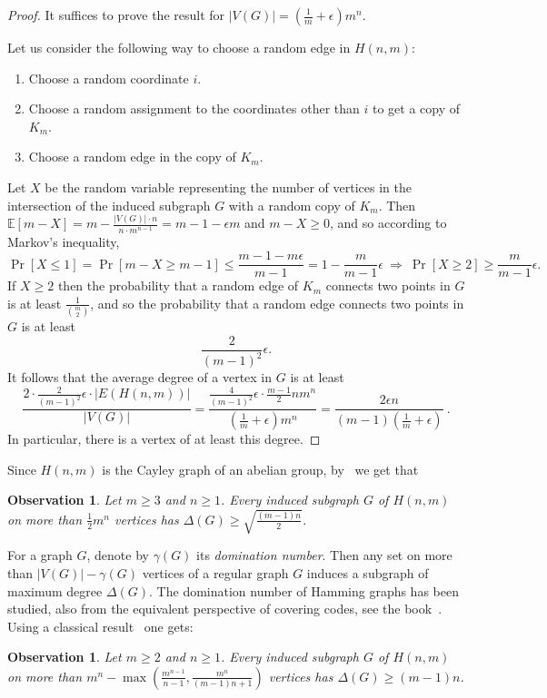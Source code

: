 \documentclass[a4paper,10pt]{amsart}
\newtheorem{obs}[thm]{Observation}
\begin{document}
\begin{proof} It suffices to prove the result for $|V(G)|=(\frac{1}{m}+\epsilon)m^n$.

\vspace{1mm}
Let us consider the following way to choose a random edge in $H(n,m)$:
\begin{enumerate}
    \item Choose a random coordinate $i$.
    \item Choose a random assignment to the coordinates other than $i$ to get a copy of $K_m$.
    \item Choose a random edge in the copy of $K_m$.
\end{enumerate}

Let $X$ be the random variable representing the number of vertices in the intersection of the induced subgraph $G$ with a random copy of $K_m$. Then $\mathbb{E}[m-X] = m -\frac{|V(G)|\cdot n}{n\cdot m^{n-1}} = m - 1 - \epsilon m$ and $m - X \geq 0$, and so according to Markov's inequality,
\[
 \Pr[X \leq 1] = \Pr[m - X \geq m - 1] \leq \frac{m - 1 - m\epsilon}{m - 1} = 1 - \frac{m}{m-1} \epsilon \ \Rightarrow\ \Pr[X \geq 2] \geq \frac{m}{m-1} \epsilon.
\]
If $X \geq 2$ then the probability that a random edge of $K_m$ connects two points in $G$ is at least $\frac{1}{\binom{m}{2}}$, and so the probability that a random edge connects two points in $G$ is at least
\[
 \frac{2}{(m-1)^2} \epsilon.
\]
It follows that the average degree of a vertex in $G$ is at least
\[
 \frac{2\cdot \frac{2}{(m-1)^2} \epsilon\cdot |E(H(n,m))|}{|V(G)|}=\frac{\frac{4}{(m-1)^2} \epsilon \cdot \frac{m-1}{2} n m^n}{(\frac{1}{m} + \epsilon) m^n} =
 \frac{2\epsilon n}{(m-1)(\frac{1}{m}+\epsilon)} \ .
\]
In particular, there is a vertex of at least this degree.
\end{proof}


Since $H(n,m)$ is the Cayley graph of an abelian group, by~\cite{PT20} we get that 

\begin{obs}
Let $m\geq 3$ and $n\geq 1$. Every induced subgraph $G$ of $H(n,m)$ on more than $\frac{1}{2}m^n$ vertices has $\Delta(G)\geq \sqrt{\frac{(m-1)n}{2}}$.
\end{obs}

For a graph $G$, denote by $\gamma(G)$ its \emph{domination number}. Then any set on more than $|V(G)|-\gamma(G)$ vertices of a regular graph $G$ induces a subgraph of maximum degree $\Delta(G)$. The domination number of Hamming graphs has been studied, also from the equivalent perspective of covering codes, see the book~\cite{CHLL97}. Using a classical result~\cite{Rod70} one gets:
\begin{obs}
    Let $m\geq 2$ and $n\geq 1$. Every induced subgraph $G$ of $H(n,m)$ on more than $m^n-\max\left(\frac{m^{n-1}}{n-1},\frac{m^n}{(m-1)n+1}\right)$ vertices has $\Delta(G)\geq (m-1)n$.
\end{obs}
\end{document}
